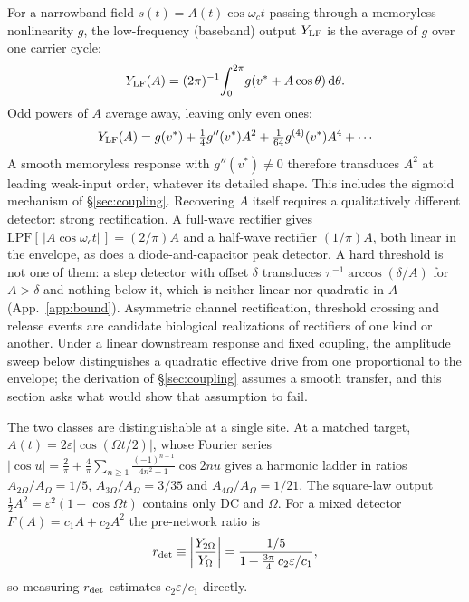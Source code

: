 \documentclass[11pt,a4paper]{article}
\newcommand{\half}{\tfrac{1}{2}}
\begin{document}
For a narrowband field $s(t)=A(t)\cos\omega_c t$ passing through a memoryless nonlinearity
$g$, the low-frequency (baseband) output $Y_{\rm LF}$ is the average of $g$ over one
carrier cycle:
\[
Y_{\rm LF}(A)=(2\pi)^{-1}\!\int_0^{2\pi}\!g(v^*+A\cos\theta)\,\mathrm{d}\theta.
\]
Odd powers of $A$ average away, leaving only even ones:
\begin{equation}
Y_{\rm LF}(A)=g(v^*)+\tfrac14 g''(v^*)A^2+\tfrac1{64}g^{(4)}(v^*)A^4+\cdots
\label{eq:cycavg}
\end{equation}
A smooth memoryless response with $g''(v^*)\neq0$ therefore transduces $A^2$ at
leading weak-input order, whatever its detailed shape. This includes the sigmoid
mechanism of \S\ref{sec:coupling}. Recovering $A$ itself requires a qualitatively
different detector: strong rectification. A full-wave rectifier gives
$\mathrm{LPF}[\,|A\cos\omega_c t|\,]=(2/\pi)A$ and a half-wave rectifier
$(1/\pi)A$, both linear in the envelope, as does a diode-and-capacitor peak detector.
A hard threshold is not one of them: a step detector with offset $\delta$ transduces
$\pi^{-1}\arccos(\delta/A)$ for $A>\delta$ and nothing below it, which is neither linear
nor quadratic in $A$ (App.~\ref{app:bound}). Asymmetric channel rectification, threshold
crossing and release events are candidate biological realizations of rectifiers of one
kind or another. Under a linear downstream response and fixed coupling, the amplitude
sweep below distinguishes a quadratic effective drive from one proportional to the
envelope; the derivation of \S\ref{sec:coupling} assumes a smooth transfer, and this
section asks what would show that assumption to fail.

The two classes are distinguishable at a single site. At a matched target,
$A(t)=2\varepsilon|\cos(\Omega t/2)|$, whose Fourier series
$|\cos u|=\tfrac2\pi+\tfrac4\pi\sum_{n\ge1}\tfrac{(-1)^{n+1}}{4n^2-1}\cos 2nu$ gives a
harmonic ladder in ratios $A_{2\Omega}/A_\Omega=1/5$, $A_{3\Omega}/A_\Omega=3/35$ and
$A_{4\Omega}/A_\Omega=1/21$. The square-law output $\half A^2=\varepsilon^2(1+\cos\Omega
t)$ contains only DC and $\Omega$. For a mixed detector $F(A)=c_1A+c_2A^2$ the
pre-network ratio is
\begin{equation}
r_{\rm det}\equiv\left|\frac{Y_{2\Omega}}{Y_\Omega}\right|
=\frac{1/5}{1+\tfrac{3\pi}{4}\,c_2\varepsilon/c_1},
\label{eq:rdet}
\end{equation}
so measuring $r_{\rm det}$ estimates $c_2\varepsilon/c_1$ directly.
\end{document}
